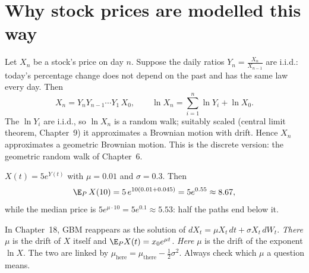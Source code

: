 \begin{pic}
\end{pic}

\section{Why stock prices are modelled this way}

Let $X_n$ be a stock's price on day $n$. Suppose the daily ratios $Y_n=\frac{X_n}{X_{n-1}}$ are i.i.d.: today's percentage change does not depend on the past and has the same law every day. Then
\[
  X_n=Y_nY_{n-1}\cdots Y_1\,X_0,\qquad \ln X_n=\sum_{i=1}^n\ln Y_i+\ln X_0 .
\]
The $\ln Y_i$ are i.i.d., so $\ln X_n$ is a random walk; suitably scaled (central limit theorem, Chapter~9) it approximates a Brownian motion with drift. Hence $X_n$ approximates a geometric Brownian motion. This is the discrete version: the geometric random walk of Chapter~6.

\begin{example}
\label{ex:gbm-price}
$X(t)=5e^{Y(t)}$ with $\mu=0.01$ and $\sigma=0.3$. Then
\[
  \E_P\,X(10)=5\,e^{10(0.01+0.045)}=5e^{0.55}\approx8.67,
\]
while the median price is $5e^{\mu\cdot10}=5e^{0.1}\approx5.53$: half the paths end below it.
\end{example}

\begin{remark}
\label{rem:two-mu}
In Chapter~18, GBM reappears as the solution of $dX_t=\mu X_t\,dt+\sigma X_t\,dW_t$. \emph{There} $\mu$ is the drift of $X$ itself and $\E_PX(t)=x_0e^{\mu t}$. \emph{Here} $\mu$ is the drift of the exponent $\ln X$. The two are linked by $\mu_{\text{here}}=\mu_{\text{there}}-\frac12\sigma^2$. Always check which $\mu$ a question means.
\end{remark}

